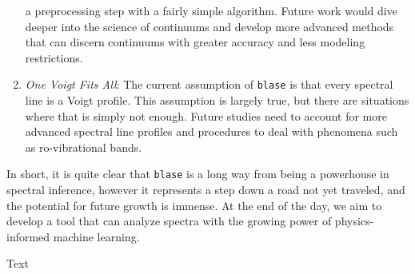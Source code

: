 \documentclass[twocolumn]{aastex631}
\begin{document}
\begin{enumerate}[label=-]
    a preprocessing step with a fairly simple algorithm. Future work would
    dive deeper into the science of continuums and develop more advanced 
    methods that can discern continuums with greater accuracy and less
    modeling restrictions.
    \item \textit{One Voigt Fits All}: The current assumption of \texttt{blase}
    is that every spectral line is a Voigt profile. This assumption is largely
    true, but there are situations where that is simply not enough. Future
    studies need to account for more advanced spectral line profiles and 
    procedures to deal with phenomena such as ro-vibrational bands.
\end{enumerate}
In short, it is quite clear that \texttt{blase} is a long way from being a
powerhouse in spectral inference, however it represents a step down a road
not yet traveled, and the potential for future growth is immense. At the 
end of the day, we aim to develop a tool that can analyze spectra with the 
growing power of physics-informed machine learning.

\begin{acknowledgements}
    Text
\end{acknowledgements}



\end{document}
